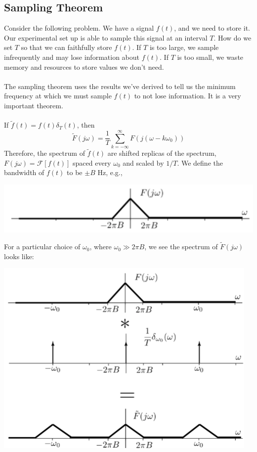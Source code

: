 \documentclass[10pt]{article}
\newcommand{\fourier}{\mathcal{F}}
\begin{document}
\subsection*{Sampling Theorem}
Consider the following problem.  We have a signal $f(t)$, and we need to store it.  Our experimental set up is able to sample this signal at an interval $T$.  How do we set $T$ so that we can faithfully store $f(t)$.  If $T$ is too large, we sample infrequently and may lose information about $f(t)$.  If $T$ is too small, we waste memory and resources to store values we don't need.\\\\
The sampling theorem uses the results we've derived to tell us the minimum frequency at which we must sample $f(t)$ to not lose information.  It is a very important theorem.\\\\
If $\tilde{f}(t) = f(t) \delta_T(t)$, then 
\[\tilde{F}(j\omega) = \frac{1}{T} \sum_{k=-\infty}^\infty F(j(\omega - k\omega_0))\]
Therefore, the spectrum of $\tilde{f}(t)$ are shifted replicas of the spectrum, $F(j\omega) = \fourier[f(t)]$ spaced every $\omega_0$ and scaled by $1/T$.  We define the bandwidth of $f(t)$ to be $\pm B$ Hz, e.g.,
\begin{center}
    \includegraphics*[width=\textwidth]{W8_10.png}
\end{center}
For a particular choice of $\omega_0$, where $\omega_0 \gg 2\pi B$, we see the spectrum of $\tilde{F}(j\omega)$ looks like:
\begin{center}
    \includegraphics*[scale=0.8]{W8_11.png}
\end{center}
\end{document}
